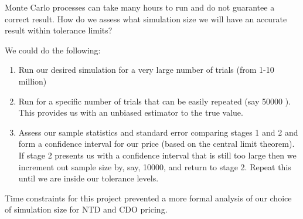 Monte Carlo processes can take many hours to run and do not guarantee a correct result.  How do we assess what simulation size we will have an accurate result within tolerance limits?

We could do the following:
\begin{enumerate}
\item	Run our desired simulation for a very large number of trials (from 1-10 million)
\item	Run for a specific number of trials that can be easily repeated (say 50000 ). This provides us with an unbiased estimator to the true value.
\item	Assess our sample statistics and standard error comparing stages 1 and 2 and form a confidence interval for our price (based on the central limit theorem).  If stage 2 presents us with a confidence interval that is still too large then we increment out sample size by, say, 10000, and return to stage 2.  Repeat this until we are inside our tolerance levels.
\end{enumerate}

Time constraints for this project prevented a more formal analysis of our choice of simulation size for NTD and CDO pricing.


